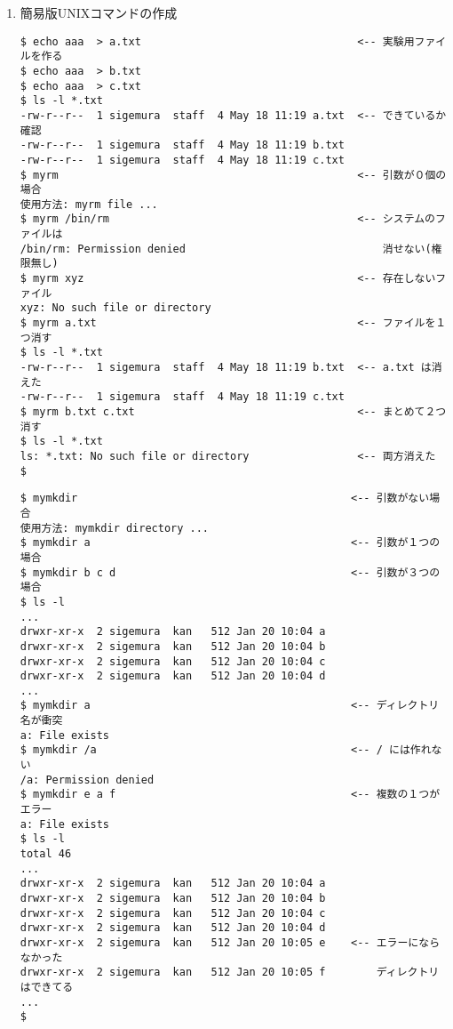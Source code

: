 \documentclass[a4j,dvipdfmx]{jarticle}
\begin{document}
\def\lstlistingname{リスト}

\begin{enumerate}
\item 簡易版UNIXコマンドの作成


\begin{lstlisting}[caption=myrmの実行例（動作テスト！！）]
$ echo aaa  > a.txt                                  <-- 実験用ファイルを作る
$ echo aaa  > b.txt
$ echo aaa  > c.txt
$ ls -l *.txt
-rw-r--r--  1 sigemura  staff  4 May 18 11:19 a.txt  <-- できているか確認
-rw-r--r--  1 sigemura  staff  4 May 18 11:19 b.txt
-rw-r--r--  1 sigemura  staff  4 May 18 11:19 c.txt
$ myrm                                               <-- 引数が０個の場合
使用方法: myrm file ...
$ myrm /bin/rm                                       <-- システムのファイルは
/bin/rm: Permission denied                               消せない(権限無し)
$ myrm xyz                                           <-- 存在しないファイル
xyz: No such file or directory
$ myrm a.txt                                         <-- ファイルを１つ消す
$ ls -l *.txt
-rw-r--r--  1 sigemura  staff  4 May 18 11:19 b.txt  <-- a.txt は消えた
-rw-r--r--  1 sigemura  staff  4 May 18 11:19 c.txt
$ myrm b.txt c.txt                                   <-- まとめて２つ消す
$ ls -l *.txt
ls: *.txt: No such file or directory                 <-- 両方消えた
$ 
\end{lstlisting}

\newpage

\begin{lstlisting}[caption=mymkdirの実行例（動作テスト！！）]
$ mymkdir                                           <-- 引数がない場合
使用方法: mymkdir directory ...
$ mymkdir a                                         <-- 引数が１つの場合
$ mymkdir b c d                                     <-- 引数が３つの場合
$ ls -l
...
drwxr-xr-x  2 sigemura  kan   512 Jan 20 10:04 a
drwxr-xr-x  2 sigemura  kan   512 Jan 20 10:04 b
drwxr-xr-x  2 sigemura  kan   512 Jan 20 10:04 c
drwxr-xr-x  2 sigemura  kan   512 Jan 20 10:04 d
...
$ mymkdir a                                         <-- ディレクトリ名が衝突
a: File exists
$ mymkdir /a                                        <-- / には作れない
/a: Permission denied
$ mymkdir e a f                                     <-- 複数の１つがエラー
a: File exists
$ ls -l
total 46
...
drwxr-xr-x  2 sigemura  kan   512 Jan 20 10:04 a
drwxr-xr-x  2 sigemura  kan   512 Jan 20 10:04 b
drwxr-xr-x  2 sigemura  kan   512 Jan 20 10:04 c
drwxr-xr-x  2 sigemura  kan   512 Jan 20 10:04 d
drwxr-xr-x  2 sigemura  kan   512 Jan 20 10:05 e    <-- エラーにならなかった
drwxr-xr-x  2 sigemura  kan   512 Jan 20 10:05 f        ディレクトリはできてる
...
$
\end{lstlisting}


\end{enumerate}
\end{document}
